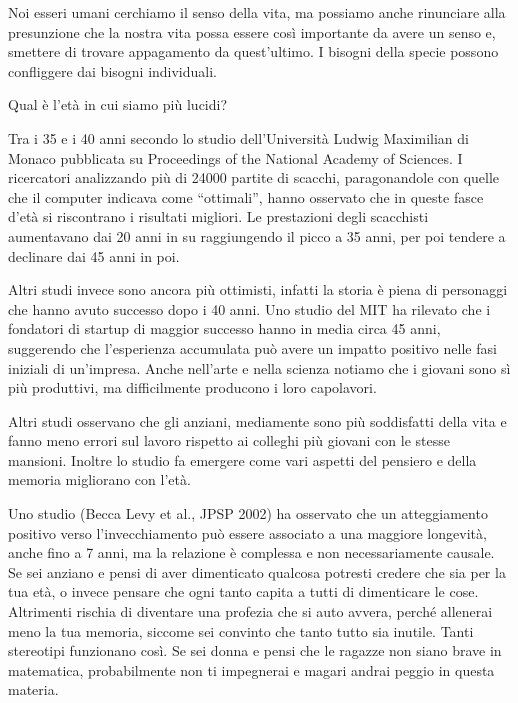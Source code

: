 \documentclass[12pt]{book} %
\begin{document}
Noi esseri umani cerchiamo il senso della vita, ma possiamo anche rinunciare alla presunzione che la nostra
vita possa essere così importante da avere un senso e, smettere di trovare appagamento da
quest'ultimo. I bisogni della specie possono confliggere dai bisogni individuali.

\begin{mdframed}[linewidth=1pt]
Qual è l'età in cui siamo più lucidi?

Tra i 35 e i 40 anni secondo lo studio dell'Università Ludwig Maximilian di Monaco pubblicata su Proceedings of the
National Academy of Sciences. I ricercatori analizzando più di 24000 partite di scacchi, paragonandole con quelle che
il computer indicava come “ottimali”, hanno osservato che in queste fasce d'età si riscontrano i risultati migliori. Le prestazioni degli scacchisti aumentavano dai 20 anni in su raggiungendo il picco a 35 anni, per poi tendere a declinare dai 45 anni in poi. 

Altri studi invece sono ancora più ottimisti, infatti la storia è piena di personaggi che hanno avuto successo dopo i 40 anni. Uno studio del MIT ha rilevato che i fondatori di startup di maggior successo hanno in media circa 45 anni, suggerendo che l’esperienza accumulata può avere un impatto positivo nelle fasi iniziali di un’impresa. Anche nell'arte e
nella scienza notiamo che i giovani sono sì più produttivi, ma difficilmente producono i loro capolavori.

Altri studi osservano che gli anziani, mediamente sono più soddisfatti della vita e fanno meno errori sul lavoro
rispetto ai colleghi più giovani con le stesse mansioni. Inoltre lo studio fa emergere come vari aspetti del pensiero e
della memoria migliorano con l'età.

Uno studio (Becca Levy et al., JPSP 2002) ha osservato che un atteggiamento positivo verso l’invecchiamento può essere associato a una maggiore longevità, anche fino a 7 anni, ma la relazione è complessa e non necessariamente causale. Se sei anziano e pensi di aver dimenticato
qualcosa potresti credere che sia per la tua età, o invece pensare che ogni tanto capita a tutti di dimenticare le cose. Altrimenti rischia di diventare una profezia che si auto avvera, perché allenerai meno la tua memoria, siccome sei
convinto che tanto tutto sia inutile. Tanti stereotipi funzionano così. Se sei donna
e pensi che le ragazze non siano brave in matematica, probabilmente non ti impegnerai e magari andrai peggio in questa materia.


\end{mdframed}
\end{document}
